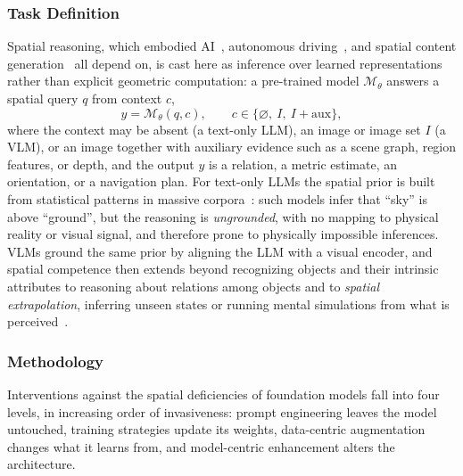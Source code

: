 \subsubsection{Task Definition}
Spatial reasoning, which embodied AI~\cite{driess2023palm, zhu2024spa}, autonomous driving~\cite{bogdoll2025muvo,zhou2024hktsg}, and spatial content generation~\cite{yu2025wonderworld, liu2025agentic} all depend on, is cast here as inference over learned representations rather than explicit geometric computation: a pre-trained model $\mathcal{M}_\theta$ answers a spatial query $q$ from context $c$,
\begin{equation}
  y=\mathcal{M}_\theta(q, c),\qquad c\in\{\varnothing,\ I,\ I+\text{aux}\},
\end{equation}
where the context may be absent (a text-only LLM), an image or image set $I$ (a VLM), or an image together with auxiliary evidence such as a scene graph, region features, or depth, and the output $y$ is a relation, a metric estimate, an orientation, or a navigation plan.
For text-only LLMs the spatial prior is built from statistical patterns in massive corpora~\cite{yamada2023evaluating,li2024advancing,wang2024picture}: such models infer that ``sky'' is above ``ground'', but the reasoning is \emph{ungrounded}, with no mapping to physical reality or visual signal, and therefore prone to physically impossible inferences.
VLMs ground the same prior by aligning the LLM with a visual encoder, and spatial competence then extends beyond recognizing objects and their intrinsic attributes to reasoning about relations among objects and to \emph{spatial extrapolation}, inferring unseen states or running mental simulations from what is perceived~\cite{liu2025deconstructing,chen2024spatialvlm}.




\subsubsection{Methodology}

Interventions against the spatial deficiencies of foundation models fall into four levels, in increasing order of invasiveness: prompt engineering leaves the model untouched, training strategies update its weights, data-centric augmentation changes what it learns from, and model-centric enhancement alters the architecture.


